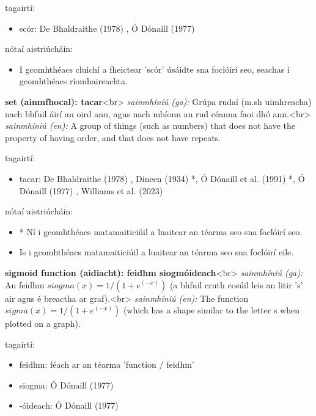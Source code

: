 \documentclass{article}
\begin{document}
tagairtí:
\begin{itemize}
	\item scór: De Bhaldraithe (1978) \cite{de-bhaldraithe}, Ó Dónaill (1977) \cite{odonaill}
\end{itemize}

nótaí aistriúcháin:
\begin{itemize}
	\item I gcomhthéacs cluichí a fheictear 'scór' úsáidte sna foclóirí seo, seachas i gcomhthéacs ríomhaireachta.
\end{itemize}


\textbf{set (ainmfhocal): tacar}<br>
\textit{sainmhíniú (ga):} Grúpa rudaí (m.sh uimhreacha) nach bhfuil áirí an oird ann, agus nach mbíonn an rud céanna faoi dhó ann.<br>
\textit{sainmhíniú (en):} A group of things (such as numbers) that does not have the property of having order, and that does not have repeats.

tagairtí:
\begin{itemize}
	\item tacar: De Bhaldraithe (1978) \cite{de-bhaldraithe}, Dineen (1934) \cite{dineen}*, Ó Dónaill et al. (1991) \cite{focloir-beag}*, Ó Dónaill (1977) \cite{odonaill}, Williams et al. (2023) \cite{storchiste}
\end{itemize}

nótaí aistriúcháin:
\begin{itemize}
	\item * Ní i gcomhthéacs matamaiticiúil a luaitear an téarma seo sna foclóirí seo.
	\item Is i gcomhthéacs matamaiticiúil a luaitear an téarma seo sna foclóirí eile.
\end{itemize}


\textbf{sigmoid function (aidiacht): feidhm siogmóideach}<br>
\textit{sainmhíniú (ga):} An feidhm $siogma(x) = 1 / (1 + e^(-x))$ (a bhfuil cruth cosúil leis an litir 's' air agus é breactha ar graf).<br>
\textit{sainmhíniú (en):} The function $sigma(x) = 1 / (1 + e^(-x))$ (which has a shape similar to the letter s when plotted on a graph).

tagairtí:
\begin{itemize}
	\item feidhm: féach ar an téarma 'function / feidhm'
	\item siogma: Ó Dónaill (1977) \cite{odonaill}
	\item -óideach: Ó Dónaill (1977) \cite{odonaill}
\end{itemize}
\end{document}
